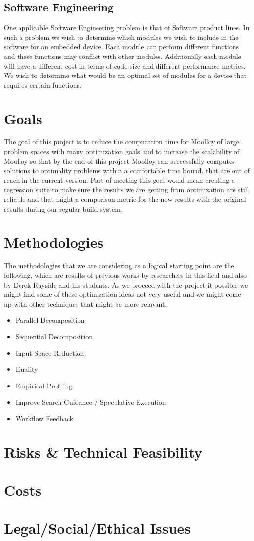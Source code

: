 \documentclass[11pt]{article}
\begin{document}
\subsection{Software Engineering}
One applicable Software Engineering problem is that of Software product
lines. In such a problem we wish to determine which modules we wish to
include in the software for an embedded device. Each module can perform
different functions and these functions may conflict with other
modules. Additionally each module will have a different cost in terms
of code size and different performance metrics. We wish to determine
what would be an optimal set of modules for a device that requires
certain functions.

\section{Goals}
The goal of this project is to reduce the computation time for Moolloy of large problem spaces with many optimization goals and to increase the scalability of Moolloy so that by the end of this project Moolloy can successfully computes solutions to optimality problems within a comfortable time bound, that are out of reach in the current version. Part of meeting this  goal would mean creating a regression suite to make sure the results we are getting from optimization are still reliable and that might a comparison metric for the new results with the original results during our regular build system.

\section{Methodologies}
The methodologies that we are considering as a logical starting point are the following, which are results of previous works by researchers in this field and also by Derek Rayside and his students. As we proceed with the project it possible we might find some of these optimization ideas not very useful and we might come up with other techniques that might be more relavant.

\begin{itemize}
  \item Parallel Decomposition
  \item Sequential Decomposition
  \item Input Space Reduction
  \item Duality
  \item Empirical Profiling
  \item Improve Search Guidance / Speculative Execution
  \item Workflow Feedback
\end{itemize}

\section{Risks \& Technical Feasibility}


\section{Costs}

\section{Legal/Social/Ethical Issues}


\printbibliography[heading=bibintoc]
\end{document}
